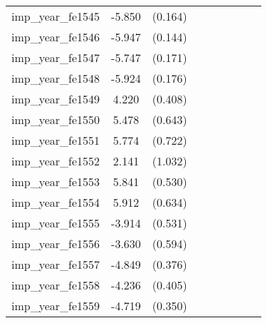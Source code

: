 {\begin{tabular}{l*{4}{cc}}
imp\_year\_fe1545&   -5.850\sym{***}&  (0.164)&                  &         &                  &         &                  &         \\
imp\_year\_fe1546&   -5.947\sym{***}&  (0.144)&                  &         &                  &         &                  &         \\
imp\_year\_fe1547&   -5.747\sym{***}&  (0.171)&                  &         &                  &         &                  &         \\
imp\_year\_fe1548&   -5.924\sym{***}&  (0.176)&                  &         &                  &         &                  &         \\
imp\_year\_fe1549&    4.220\sym{***}&  (0.408)&                  &         &                  &         &                  &         \\
imp\_year\_fe1550&    5.478\sym{***}&  (0.643)&                  &         &                  &         &                  &         \\
imp\_year\_fe1551&    5.774\sym{***}&  (0.722)&                  &         &                  &         &                  &         \\
imp\_year\_fe1552&    2.141\sym{*}  &  (1.032)&                  &         &                  &         &                  &         \\
imp\_year\_fe1553&    5.841\sym{***}&  (0.530)&                  &         &                  &         &                  &         \\
imp\_year\_fe1554&    5.912\sym{***}&  (0.634)&                  &         &                  &         &                  &         \\
imp\_year\_fe1555&   -3.914\sym{***}&  (0.531)&                  &         &                  &         &                  &         \\
imp\_year\_fe1556&   -3.630\sym{***}&  (0.594)&                  &         &                  &         &                  &         \\
imp\_year\_fe1557&   -4.849\sym{***}&  (0.376)&                  &         &                  &         &                  &         \\
imp\_year\_fe1558&   -4.236\sym{***}&  (0.405)&                  &         &                  &         &                  &         \\
imp\_year\_fe1559&   -4.719\sym{***}&  (0.350)&                  &         &                  &         &                  &         \\

\end{tabular}}
